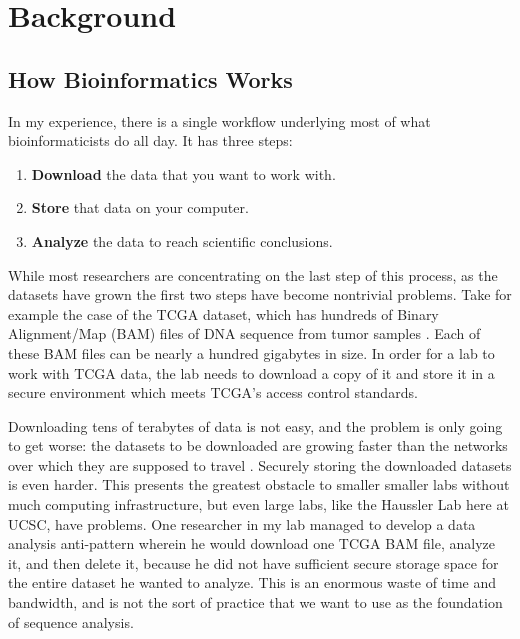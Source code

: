 \documentclass[11pt,proposal]{ucthesis}
\begin{document}
        
        
\chapter{Background}

\section{How Bioinformatics Works}

In my experience, there is a single workflow underlying most of what bioinformaticists do all day. It has three steps:

\begin{enumerate}
\item \textbf{Download} the data that you want to work with.
\item \textbf{Store} that data on your computer.
\item \textbf{Analyze} the data to reach scientific conclusions.
\end{enumerate}

While most researchers are concentrating on the last step of this process, as the datasets have grown the first two steps have become nontrivial problems. Take for example the case of the TCGA dataset, which has hundreds of Binary Alignment/Map (BAM) files of DNA sequence from tumor samples \cite{li2009sequence,tcga2014sample}. Each of these BAM files can be nearly a hundred gigabytes in size. In order for a lab to work with TCGA data, the lab needs to download a copy of it and store it in a secure environment which meets TCGA's access control standards.

Downloading tens of terabytes of data is not easy, and the problem is only going to get worse: the datasets to be downloaded are growing faster than the networks over which they are supposed to travel \cite{stein2010case}. Securely storing the downloaded datasets is even harder. This presents the greatest obstacle to smaller smaller labs without much computing infrastructure, but even large labs, like the Haussler Lab here at UCSC, have problems. One researcher in my lab managed to develop a data analysis anti-pattern wherein he would download one TCGA BAM file, analyze it, and then delete it, because he did not have sufficient secure storage space for the entire dataset he wanted to analyze. This is an enormous waste of time and bandwidth, and is not the sort of practice that we want to use as the foundation of sequence analysis.
\end{document}
